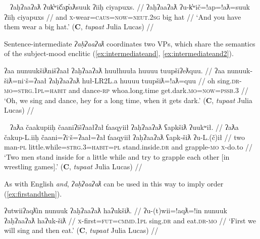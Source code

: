 \ex~ \label{ex:sentinitandnoclitics}
\begingl
\glpreamble ʔaḥʔaaʔaƛ ʔuk̓ʷič̓ap̓aƛsuuk ʔiiḥ ciyapuxs. //
\gla ʔaḥʔaaʔaƛ ʔu-k̓ʷič=!ap=!aƛ=suuk ʔiiḥ ciyapuxs //
\glb and \textsc{x}-wear=\textsc{caus}=\textsc{now}=\textsc{neut.2sg} big hat //
\glft `And you have them wear a big hat.' (\textbf{C}, \textit{tupaat} Julia Lucas) //
\endgl
\xe


Sentence-intermediate \textit{ʔaḥʔaaʔaƛ} coordinates two VPs, which share the semantics of the subject-mood enclitic (\ref{ex:intermediateand}, \ref{ex:intermediateand2}).

\ex \label{ex:intermediateand}
\begingl
\glpreamble ʔaa nunuukšiƛnišʔaał ʔaḥʔaaʔaƛ huułhuuła huuuu tuupšiʔeƛquu. //
\gla ʔaa nunuuk-šiƛ=niˑš=ʔaał ʔaḥʔaaʔaƛ huł-LR2L.a huuuu tuupšiƛ=!aƛ=quu //
\glb oh sing.\textsc{dr}-\textsc{mo}=\textsc{strg.1pl}=\textsc{habit} and dance-\textsc{rp} whoa.long.time get.dark.\textsc{mo}=\textsc{now}=\textsc{pssb.3} //
\glft `Oh, we sing and dance, hey for a long time, when it gets dark.' (\textbf{C}, \textit{tupaat} Julia Lucas) //
\endgl
\xe


\ex~ \label{ex:intermediateand2}
\begingl
\glpreamble ʔaƛa čaakupiiḥ čaaniʔišʔaałʔał t̓aaqyiił ʔaḥʔaaʔaƛ ʕapkšiƛ ʔuukʷił. //
\gla ʔaƛa čakup-L.iiḥ čaani=ʔiˑš=ʔaał=ʔał t̓aaqyiił ʔaḥʔaaʔaƛ ʕapk-šiƛ ʔu-L.(č)ił //
\glb two man-\textsc{pl} little.while=\textsc{strg.3}=\textsc{habit}=\textsc{pl} stand.inside.\textsc{dr} and grapple-\textsc{mo} \textsc{x}-do.to //
\glft `Two men stand inside for a little while and try to grapple each other [in wrestling games].' (\textbf{C}, \textit{tupaat} Julia Lucas) //
\endgl
\xe

As with English \textit{and}, \textit{ʔaḥʔaaʔaƛ} can be used in this way to imply order (\ref{ex:firstandthen}).

\ex \label{ex:firstandthen}
\begingl
\glpreamble ʔutwiiʔaqƛ̓in nunuuk ʔaḥʔaaʔaƛ haʔukšiƛ. //
\gla ʔu-(t)wii=!aqƛ=!in nunuuk ʔaḥʔaaʔaƛ haʔuk-šiƛ //
\glb \textsc{x}-first=\textsc{fut}=\textsc{cmmd.1pl} sing.\textsc{dr} and eat.\textsc{dr}-\textsc{mo} //
\glft `First we will sing and then eat.' (\textbf{C}, \textit{tupaat} Julia Lucas) //
\endgl
\xe

